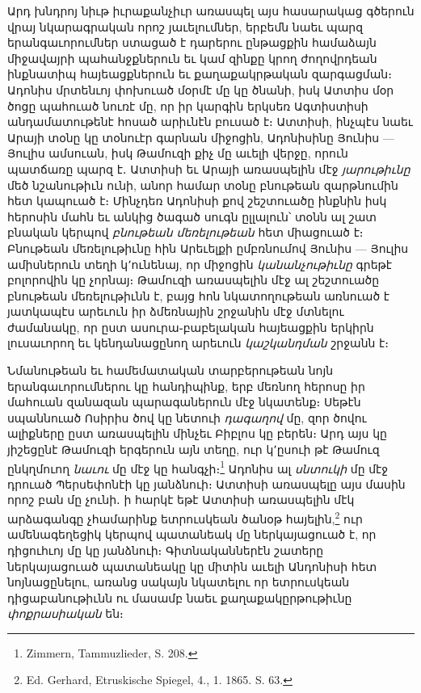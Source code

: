 \documentclass{article}
\begin{document}
{Արդ խնդրոյ նիւթ իւրաքանչիւր առասպել այս հասարակաց գծերուն վրայ նկարագրական որոշ յաւելումներ, երբեմն նաեւ պարզ երանգաւորումներ ստացած է դարերու ընթացքին համաձայն միջավայրի պահանջքներուն եւ կամ զինքը կրող ժողովրդեան ինքնատիպ հայեացքներուն եւ քաղաքակրթական զարգացման։ Ադոնիս մրտենւոյ փոխուած մօրմէ մը կը ծնանի, իսկ Ատտիս մօր ծոցը պահուած նուռէ մը, որ իր կարգին երկսեռ Ագտիստիսի անդամատութենէ հոսած արիւնէն բուսած է։ Ատտիսի, ինչպէս նաեւ Արայի տօնը կը տօնուէր գարնան միջոցին, Ադոնիսինը Յունիս — Յուլիս ամսուան, իսկ Թամուզի քիչ մը աւելի վերջը, որուն պատճառը պարզ է․ Ատտիսի եւ Արայի առասպելին մէջ \emph{յարութիւնը} մեծ նշանութիւն ունի, անոր համար տօնը բնութեան զարթնումին հետ կապուած է։ Մինչդեռ Ադոնիսի քով շեշտուածը ինքնին իսկ հերոսին մահն եւ անկից ծագած սուգն ըլլալուն՝ տօնն ալ շատ բնական կերպով \emph{բնութեան մեռելութեան} հետ միացուած է։ Բնութեան մեռելութիւնը հին Արեւելքի ըմբռնումով Յունիս — Յուլիս ամիսներուն տեղի կ՚ունենայ, որ միջոցին \emph{կանանչութիւնը} գրեթէ բոլորովին կը չորնայ։ Թամուզի առասպելին մէջ ալ շեշտուածը բնութեան մեռելութիւնն է, բայց հոն նկատողութեան առնուած է յատկապէս արեւուն իր ձմեռնային շրջանին մէջ մտնելու ժամանակը, որ ըստ ասուրա֊բաբելական հայեացքին երկիրն լուսաւորող եւ կենդանացընող արեւուն \emph{կաշկանդման} շրջանն է։

Նմանութեան եւ համեմատական տարբերութեան նոյն երանգաւորումներու կը հանդիպինք, երբ մեռնող հերոսը իր մահուան զանազան պարագաներուն մէջ նկատենք։ Սեթէն սպաննուած Ոսիրիս ծով կը նետուի \emph{դագաղով} մը, զոր ծովու ալիքները ըստ առասպելին մինչեւ Բիբլոս կը բերեն։ Արդ այս կը յիշեցընէ Թամուզի երգերուն այն տեղը, ուր կ՚ըսուի թէ Թամուզ ընկղմուող \emph{նաւու} մը մէջ կը հանգչի։\footnote{Zimmern, Tammuzlieder, S. 208.} Ադոնիս ալ \emph{սնտուկի} մը մէջ դրուած Պերսեփոնէի կը յանձնուի։ Ատտիսի առասպելը այս մասին որոշ բան մը չունի․ ի հարկէ եթէ Ատտիսի առասպելին մէկ արձագանգը չհամարինք ետրուսկեան ծանօթ հայելին,\footnote{Ed. Gerhard, Etruskische Spiegel, 4., 1. 1865. S. 63.} ուր ամենագեղեցիկ կերպով պատանեակ մը ներկայացուած է, որ դիցուհւոյ մը կը յանձնուի։ Գիտնականներէն շատերը ներկայացուած պատանեակը կը միտին աւելի Անդոնիսի հետ նոյնացընելու, առանց սակայն նկատելու որ ետրուսկեան դիցաբանութիւնն ու մասամբ նաեւ քաղաքակըրթութիւնը \emph{փոքրասիական} են։

}
\end{document}
